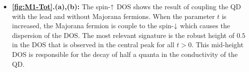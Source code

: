 \begin{itemize}
    \item\textbf{ \ref{fig:M1-Tot}.(a),(b):}  The spin-$\uparrow$ DOS shows the result of coupling the QD with the lead and without Majorana fermions. When the parameter $t$ is increased, the Majorana fermion is couple to the spin-$\downarrow$ which causes the dispersion of the DOS. The most relevant signature is the robust height of $0.5$  in the DOS that is observed in the central peak for all $t>0$. This mid-height DOS is responsible for the decay of half a quanta in the conductivity of the QD.

    \begin{figure}[h]
     \centering
       \\
    

\end{figure}
\end{itemize}
